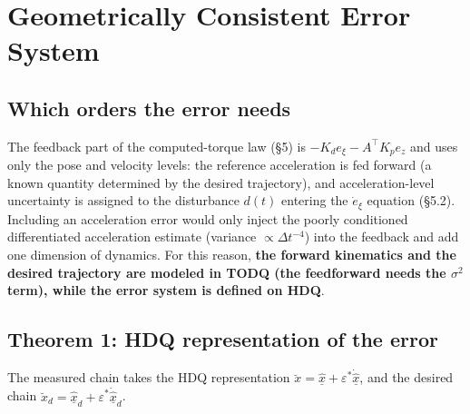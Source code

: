 \section{Geometrically Consistent Error System}

\subsection{Which orders the error needs}

The feedback part of the computed-torque law (\S5) is $-K_de_\xi-A^\top K_pe_z$ and uses only the pose and velocity levels: the reference acceleration is fed forward (a known quantity determined by the desired trajectory), and acceleration-level uncertainty is assigned to the disturbance $d(t)$ entering the $\dot e_\xi$ equation (\S5.2). Including an acceleration error would only inject the poorly conditioned differentiated acceleration estimate (variance $\propto\Delta t^{-4}$) into the feedback and add one dimension of dynamics. For this reason, \textbf{the forward kinematics and the desired trajectory are modeled in TODQ (the feedforward needs the $\sigma^2$ term), while the error system is defined on HDQ}.

\subsection{Theorem 1: HDQ representation of the error}

The measured chain takes the HDQ representation $\breve x=\hat{\underline x}+\varepsilon^*\dot{\hat{\underline x}}$, and the desired chain $\breve x_d=\hat{\underline x}_d+\varepsilon^*\dot{\hat{\underline x}}_d$.

